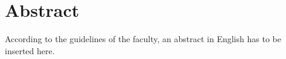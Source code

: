 \chapter*{Abstract}

According to the guidelines of the faculty, an abstract in English has to be inserted here.